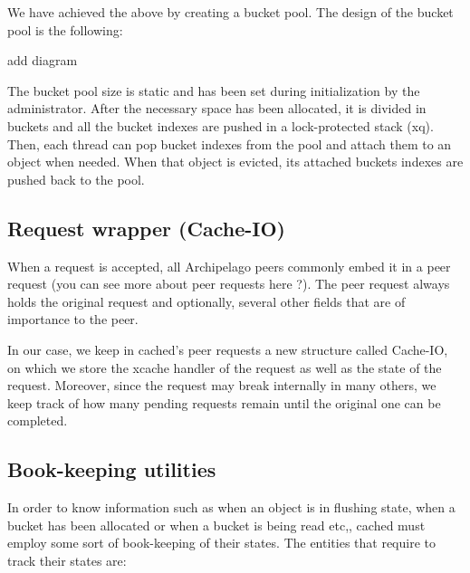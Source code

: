 We have achieved the above by creating a bucket pool. The design of the bucket 
pool is the following:

\fixme add diagram

The bucket pool size is static and has been set during initialization by the 
administrator. After the necessary space has been allocated, it is divided in 
buckets and all the bucket indexes are pushed in a lock-protected stack (xq).  
Then, each thread can pop bucket indexes from the pool and attach them
to an object when needed. When that object is evicted, its attached buckets 
indexes are pushed back to the pool.

\subsection{Request wrapper (Cache-IO)}

When a request is accepted, all Archipelago peers commonly embed it in a peer 
request (you can see more about peer requests here ?). The peer request always 
holds the original request and optionally, several other fields that are of 
importance to the peer.

In our case, we keep in cached's peer requests a new structure called Cache-IO, 
on which we store the xcache handler of the request as well as the state of the 
request. Moreover, since the request may break internally in many others, we 
keep track of how many pending requests remain until the original one can be 
completed.

\subsection{Book-keeping utilities}\label{sec:cached-states-design}

In order to know information such as when an object is in flushing state, when 
a bucket has been allocated or when a bucket is being read etc,, cached must 
employ some sort of book-keeping of their states. The entities that require to 
track their states are:

